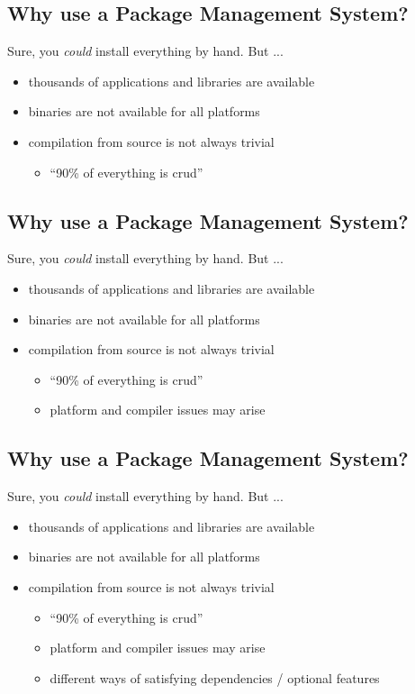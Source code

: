 \documentclass[xga]{xdvislides}
\begin{document}
\subsection{Why use a Package Management System?}
Sure, you {\em could} install everything by hand.  But ...
\begin{itemize}
	\item thousands of applications and libraries are available
	\item binaries are not available for all platforms
	\item compilation from source is not always trivial
		\begin{itemize}
			\item ``90\% of everything is crud''
		\end{itemize}
\end{itemize}

\subsection{Why use a Package Management System?}
Sure, you {\em could} install everything by hand.  But ...
\begin{itemize}
	\item thousands of applications and libraries are available
	\item binaries are not available for all platforms
	\item compilation from source is not always trivial
		\begin{itemize}
			\item ``90\% of everything is crud''
			\item platform and compiler issues may arise
		\end{itemize}
\end{itemize}

\subsection{Why use a Package Management System?}
Sure, you {\em could} install everything by hand.  But ...
\begin{itemize}
	\item thousands of applications and libraries are available
	\item binaries are not available for all platforms
	\item compilation from source is not always trivial
		\begin{itemize}
			\item ``90\% of everything is crud''
			\item platform and compiler issues may arise
			\item different ways of satisfying dependencies / optional
				features
		\end{itemize}
\end{itemize}
\end{document}

